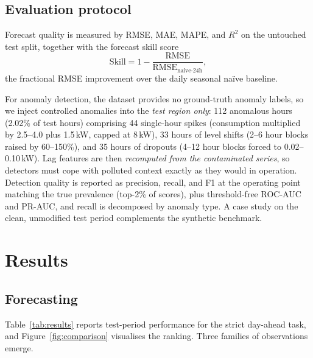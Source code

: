 \documentclass[10pt,a4paper]{article}
\begin{document}
\subsection{Evaluation protocol}
Forecast quality is measured by RMSE, MAE, MAPE, and $R^2$ on the untouched test
split, together with the forecast skill score
\begin{equation}\label{eq:skill}
\text{Skill} = 1 - \frac{\mathrm{RMSE}}{\mathrm{RMSE}_{\text{naive-24h}}},
\end{equation}
the fractional RMSE improvement over the daily seasonal na\"ive baseline.

For anomaly detection, the dataset provides no ground-truth anomaly labels, so we
inject controlled anomalies into the \emph{test region only}: 112 anomalous hours
(2.02\% of test hours) comprising 44 single-hour spikes (consumption multiplied by
2.5--4.0 plus 1.5\,kW, capped at 8\,kW), 33 hours of level shifts (2--6 hour blocks
raised by 60--150\%), and 35 hours of dropouts (4--12 hour blocks forced to
0.02--0.10\,kW). Lag features are then \emph{recomputed from the contaminated
series}, so detectors must cope with polluted context exactly as they would in
operation. Detection quality is reported as precision, recall, and F1 at the
operating point matching the true prevalence (top-2\% of scores), plus threshold-free
ROC-AUC and PR-AUC, and recall is decomposed by anomaly type. A case study on the
clean, unmodified test period complements the synthetic benchmark.

\section{Results}\label{sec:results}

\subsection{Forecasting}
Table~\ref{tab:results} reports test-period performance for the strict day-ahead
task, and Figure~\ref{fig:comparison} visualises the ranking. Three families of
observations emerge.
\end{document}
